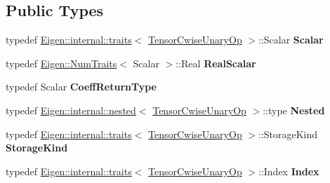 \subsection*{Public Types}
\begin{DoxyCompactItemize}
\item 
\mbox{\label{class_eigen_1_1_tensor_cwise_unary_op_a5ab327094bed5a2afba69bb9386ff44d}} 
typedef \hyperlink{struct_eigen_1_1internal_1_1traits}{Eigen\+::internal\+::traits}$<$ \hyperlink{class_eigen_1_1_tensor_cwise_unary_op}{Tensor\+Cwise\+Unary\+Op} $>$\+::Scalar {\bfseries Scalar}
\item 
\mbox{\label{class_eigen_1_1_tensor_cwise_unary_op_ae7784743a8b3eecb64567d93731c487e}} 
typedef \hyperlink{group___core___module_struct_eigen_1_1_num_traits}{Eigen\+::\+Num\+Traits}$<$ Scalar $>$\+::Real {\bfseries Real\+Scalar}
\item 
\mbox{\label{class_eigen_1_1_tensor_cwise_unary_op_a5eeb6543700ffe32c1d996e1b0d79e50}} 
typedef Scalar {\bfseries Coeff\+Return\+Type}
\item 
\mbox{\label{class_eigen_1_1_tensor_cwise_unary_op_acc4894a5f4d28b24d67aaa35ed135192}} 
typedef \hyperlink{struct_eigen_1_1internal_1_1nested}{Eigen\+::internal\+::nested}$<$ \hyperlink{class_eigen_1_1_tensor_cwise_unary_op}{Tensor\+Cwise\+Unary\+Op} $>$\+::type {\bfseries Nested}
\item 
\mbox{\label{class_eigen_1_1_tensor_cwise_unary_op_a0162f82932dc0cf82d3a9d538bd7805f}} 
typedef \hyperlink{struct_eigen_1_1internal_1_1traits}{Eigen\+::internal\+::traits}$<$ \hyperlink{class_eigen_1_1_tensor_cwise_unary_op}{Tensor\+Cwise\+Unary\+Op} $>$\+::Storage\+Kind {\bfseries Storage\+Kind}
\item 
\mbox{\label{class_eigen_1_1_tensor_cwise_unary_op_aae1bc0933bbef825c05ed8d40d8b3b1a}} 
typedef \hyperlink{struct_eigen_1_1internal_1_1traits}{Eigen\+::internal\+::traits}$<$ \hyperlink{class_eigen_1_1_tensor_cwise_unary_op}{Tensor\+Cwise\+Unary\+Op} $>$\+::Index {\bfseries Index}
\item 

\end{DoxyCompactItemize}
